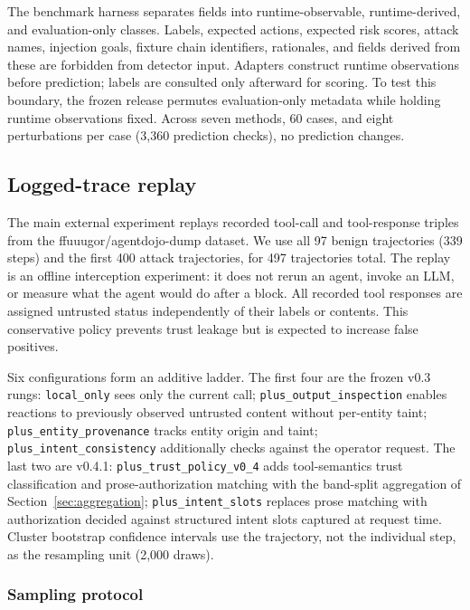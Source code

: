 \documentclass[letterpaper,twocolumn,10pt]{article}
\begin{document}
The benchmark harness separates fields into runtime-observable,
runtime-derived, and evaluation-only classes. Labels, expected actions,
expected risk scores, attack names, injection goals, fixture chain
identifiers, rationales, and fields derived from these are forbidden from
detector input. Adapters construct runtime observations before prediction;
labels are consulted only afterward for scoring. To test this boundary, the
frozen release permutes evaluation-only metadata while holding runtime
observations fixed. Across seven methods, 60 cases, and eight perturbations per
case (3,360 prediction checks), no prediction changes.

\subsection{Logged-trace replay}
\label{sec:replay}

The main external experiment replays recorded tool-call and tool-response
triples from the ffuuugor/agentdojo-dump dataset. We use all 97 benign
trajectories (339 steps) and the first 400 attack trajectories, for 497
trajectories total. The replay is an offline interception experiment: it does
not rerun an agent, invoke an LLM, or measure what the agent would do after a
block. All recorded tool responses are assigned untrusted status independently
of their labels or contents. This conservative policy prevents trust leakage
but is expected to increase false positives.

Six configurations form an additive ladder. The first four are the frozen v0.3
rungs: \texttt{local\_only} sees only the current call;
\texttt{plus\_output\_inspection} enables reactions to previously observed
untrusted content without per-entity taint;
\texttt{plus\_entity\_provenance} tracks entity origin and taint;
\texttt{plus\_intent\_consistency} additionally checks against the operator
request. The last two are v0.4.1: \texttt{plus\_trust\_policy\_v0\_4} adds
tool-semantics trust classification and prose-authorization matching with the
band-split aggregation of Section~\ref{sec:aggregation};
\texttt{plus\_intent\_slots} replaces prose matching with authorization decided
against structured intent slots captured at request time. Cluster bootstrap
confidence intervals use the trajectory, not the individual step, as the
resampling unit (2,000 draws).

\subsubsection{Sampling protocol}
\label{sec:sampling}
\end{document}

